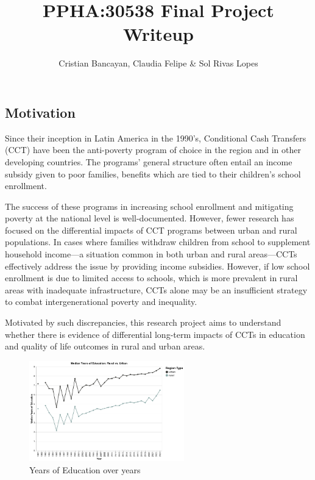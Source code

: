 \documentclass[
  10pt,
]{article}
\title{\large PPHA:30538 Final Project Writeup}
\author{\normalsize Cristian Bancayan, Claudia Felipe \& Sol Rivas
Lopes}
\date{}
\begin{document}
\maketitle


\subsection{Motivation}\label{motivation}

Since their inception in Latin America in the 1990's, Conditional Cash
Transfers (CCT) have been the anti-poverty program of choice in the
region and in other developing countries. The programs' general
structure often entail an income subsidy given to poor families,
benefits which are tied to their children's school enrollment.

The success of these programs in increasing school enrollment and
mitigating poverty at the national level is well-documented. However,
fewer research has focused on the differential impacts of CCT programs
between urban and rural populations. In cases where families withdraw
children from school to supplement household income---a situation common
in both urban and rural areas---CCTs effectively address the issue by
providing income subsidies. However, if low school enrollment is due to
limited access to schools, which is more prevalent in rural areas with
inadequate infrastructure, CCTs alone may be an insufficient strategy to
combat intergenerational poverty and inequality.

Motivated by such discrepancies, this research project aims to
understand whether there is evidence of differential long-term impacts
of CCTs in education and quality of life outcomes in rural and urban
areas.

\begin{figure}[H]

{\centering \includegraphics[width=0.6\textwidth,height=\textheight]{Graphs/years_edu_all.png}

}

\caption{Years of Education over years}

\end{figure}%
\end{document}
